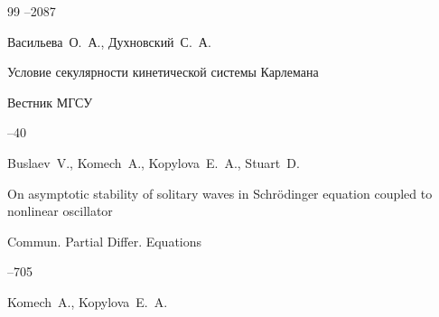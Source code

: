 \begin{thebibliography}{99}
--2087




















\by Васильева~О.~А., Духновский~С.~А.

\paper Условие секулярности кинетической системы Карлемана

\jour  Вестник МГСУ



--40





\by Buslaev~V., Komech~A., Kopylova~E.~A., Stuart~D. 

\paper On asymptotic stability of solitary waves in Schrödinger equation coupled to nonlinear oscillator


\jour Commun. Partial Differ. Equations 




--705





\by Komech~A., Kopylova~E.~A.  


\end{thebibliography}
